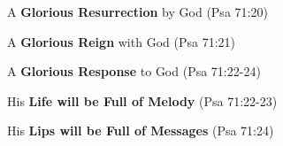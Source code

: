 \begin{compactenum}[I.][7]
\begin{compactenum}[A.]
\begin{compactenum}[1.]
    			\item A \textbf{Glorious Resurrection} by God (Psa 71:20)
    			\item A \textbf{Glorious Reign} with God (Psa 71:21)
    			\item A \textbf{Glorious Response} to God (Psa 71:22-24)
    			\begin{compactenum}[1.]
    				\item His \textbf{Life will be Full of Melody}  (Psa 71:22-23)
    				\item His \textbf{Lips will be Full of Messages}  (Psa 71:24)
			\end{compactenum}
    		\end{compactenum}
    \end{compactenum}
\end{compactenum}